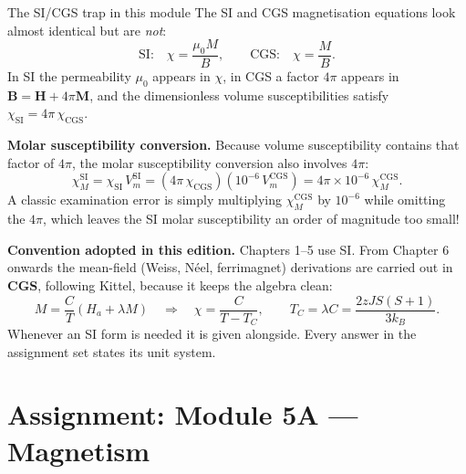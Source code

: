 \documentclass[11pt,a4paper]{article}
\newcommand{\vb}[1]{\mathbf{#1}}
\begin{document}
\begin{pitfallbox}{The SI/CGS trap in this module}
The SI and CGS magnetisation equations look almost identical but are \emph{not}:
\[
\text{SI:}\quad \chi = \frac{\mu_0 M}{B},
\qquad
\text{CGS:}\quad \chi = \frac{M}{B}.
\]
In SI the permeability $\mu_0$ appears in $\chi$, in CGS a factor $4\pi$ appears in $\vb{B}=\vb{H}+4\pi\vb{M}$, and the dimensionless volume susceptibilities satisfy $\chi_{\mathrm{SI}} = 4\pi\,\chi_{\mathrm{CGS}}$.

\textbf{Molar susceptibility conversion.} Because volume susceptibility contains that factor of $4\pi$, the molar susceptibility conversion also involves $4\pi$:
\[
\chi_M^{\mathrm{SI}} = \chi_{\mathrm{SI}}\,V_m^{\mathrm{SI}} = (4\pi\,\chi_{\mathrm{CGS}})(10^{-6}\,V_m^{\mathrm{CGS}}) = 4\pi\times 10^{-6}\,\chi_M^{\mathrm{CGS}}.
\]
A classic examination error is simply multiplying $\chi_M^{\mathrm{CGS}}$ by $10^{-6}$ while omitting the $4\pi$, which leaves the SI molar susceptibility an order of magnitude too small!

\textbf{Convention adopted in this edition.} Chapters 1--5 use SI. From Chapter 6 onwards the mean-field (Weiss, N\'eel, ferrimagnet) derivations are carried out in \textbf{CGS}, following Kittel, because it keeps the algebra clean:
\[
M = \frac{C}{T}\left(H_a + \lambda M\right)
\quad\Longrightarrow\quad
\chi = \frac{C}{T - T_C},
\qquad
T_C = \lambda C = \frac{2zJS(S+1)}{3k_B}.
\]
Whenever an SI form is needed it is given alongside. Every answer in the assignment set states its unit system.
\end{pitfallbox}

\clearpage

\tableofcontents
\clearpage
\section*{Assignment: Module 5A --- Magnetism}
\label{sec:assignment_module5}
\end{document}
